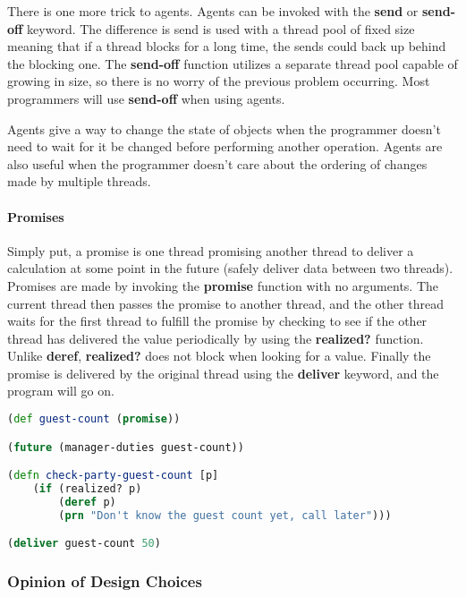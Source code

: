     There is one more trick to agents. Agents can be invoked with the \textbf{send} or \textbf{send-off} keyword. The difference is send is used with a thread pool of fixed size meaning that if a thread blocks for a long time, the sends could back up behind the blocking one. The \textbf{send-off} function utilizes a separate thread pool capable of growing in size, so there is no worry of the previous problem occurring. Most programmers will use \textbf{send-off} when using agents.
    
    Agents give a way to change the state of objects when the programmer doesn't need to wait for it be changed before performing another operation. Agents are also useful when the programmer doesn't care about the ordering of changes made by multiple threads.   
    
    \paragraph{Promises}
    
    Simply put, a promise is one thread promising another thread to deliver a calculation at some point in the future (safely deliver data between two threads). Promises are made by invoking the \textbf{promise} function with no arguments. The current thread then passes the promise to another thread, and the other thread waits for the first thread to fulfill the promise by checking to see if the other thread has delivered the value periodically by using the \textbf{realized?} function. Unlike \textbf{deref}, \textbf{realized?} does not block when looking for a value. Finally the promise is delivered by the original thread using the \textbf{deliver} keyword, and the program will go on.
    \cite{UnderstandingClojureConcurrency_Website_BlakeSmith}
    \cite{MultiCoreParallelizationClojure_JournalArticle_Kraus}
    \cite{ClojureFourConcurrencyModels_Website_Galpin}
    \cite{Clojure_ModularProgrammingFunctionalAbstract_JournalArticle_Dhiman}
    
    \begin{lstlisting}[language=clojure]
(def guest-count (promise))

(future (manager-duties guest-count))

(defn check-party-guest-count [p]
    (if (realized? p)
	    (deref p)
	    (prn "Don't know the guest count yet, call later")))

(deliver guest-count 50)    
    \end{lstlisting}

\subsubsection{Opinion of Design Choices}

